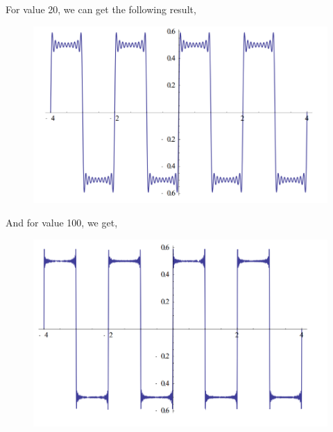 \documentclass{article}
\begin{document}
For value 20, we can get the following result,
\begin{figure}[H]
	\centering
	\includegraphics[width=0.7\linewidth]{p10}
	\label{fig:p10}
\end{figure}
And for value 100, we get,
\begin{figure}[H]
	\centering
	\includegraphics[width=0.7\linewidth]{p11}
	\label{fig:p11}
\end{figure}
\end{document}
